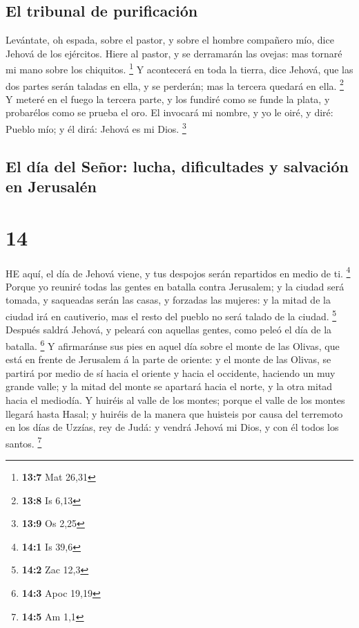 \hypertarget{el-tribunal-de-purificaciuxf3n}{%
\subsection{El tribunal de
purificación}\label{el-tribunal-de-purificaciuxf3n}}

 Levántate, oh espada, sobre el pastor, y sobre el hombre
compañero mío, dice Jehová de los ejércitos. Hiere al pastor, y se
derramarán las ovejas: mas tornaré mi mano sobre los chiquitos.
\footnote{\textbf{13:7} Mat 26,31}  Y acontecerá en toda la
tierra, dice Jehová, que las dos partes serán taladas en ella, y se
perderán; mas la tercera quedará en ella. \footnote{\textbf{13:8} Is
  6,13}  Y meteré en el fuego la tercera parte, y los
fundiré como se funde la plata, y probarélos como se prueba el oro. El
invocará mi nombre, y yo le oiré, y diré: Pueblo mío; y él dirá: Jehová
es mi Dios. \footnote{\textbf{13:9} Os 2,25}

\hypertarget{el-duxeda-del-seuxf1or-lucha-dificultades-y-salvaciuxf3n-en-jerusaluxe9n}{%
\subsection{El día del Señor: lucha, dificultades y salvación en
Jerusalén}\label{el-duxeda-del-seuxf1or-lucha-dificultades-y-salvaciuxf3n-en-jerusaluxe9n}}

\hypertarget{section-13}{%
\section{14}\label{section-13}}

 HE aquí, el día de Jehová viene, y tus despojos serán
repartidos en medio de ti. \footnote{\textbf{14:1} Is 39,6} 
Porque yo reuniré todas las gentes en batalla contra Jerusalem; y la
ciudad será tomada, y saqueadas serán las casas, y forzadas las mujeres:
y la mitad de la ciudad irá en cautiverio, mas el resto del pueblo no
será talado de la ciudad. \footnote{\textbf{14:2} Zac 12,3} 
Después saldrá Jehová, y peleará con aquellas gentes, como peleó el día
de la batalla. \footnote{\textbf{14:3} Apoc 19,19}  Y
afirmaránse sus pies en aquel día sobre el monte de las Olivas, que está
en frente de Jerusalem á la parte de oriente: y el monte de las Olivas,
se partirá por medio de sí hacia el oriente y hacia el occidente,
haciendo un muy grande valle; y la mitad del monte se apartará hacia el
norte, y la otra mitad hacia el mediodía.  Y huiréis al
valle de los montes; porque el valle de los montes llegará hasta Hasal;
y huiréis de la manera que huisteis por causa del terremoto en los días
de Uzzías, rey de Judá: y vendrá Jehová mi Dios, y con él todos los
santos. \footnote{\textbf{14:5} Am 1,1}

